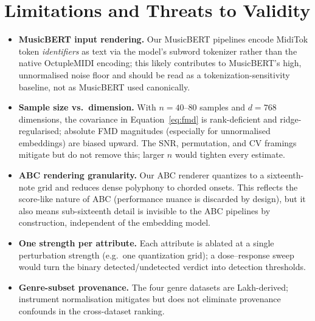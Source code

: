 \documentclass[11pt]{article}
\begin{document}
\section{Limitations and Threats to Validity}
\label{sec:limitations}
\begin{itemize}\itemsep2pt
\item \textbf{MusicBERT input rendering.} Our MusicBERT pipelines encode
MidiTok token \emph{identifiers} as text via the model's subword tokenizer
rather than the native OctupleMIDI encoding; this likely contributes to
MusicBERT's high, unnormalised noise floor and should be read as a
tokenization-sensitivity baseline, not as MusicBERT used canonically.
\item \textbf{Sample size vs.\ dimension.} With $n=40$--$80$ samples and
$d=768$ dimensions, the covariance in Equation~\eqref{eq:fmd} is
rank-deficient and ridge-regularised; absolute FMD magnitudes (especially
for unnormalised embeddings) are biased upward. The SNR, permutation, and CV
framings mitigate but do not remove this; larger $n$ would tighten every
estimate.
\item \textbf{ABC rendering granularity.} Our ABC renderer quantizes to a
sixteenth-note grid and reduces dense polyphony to chorded onsets. This
reflects the score-like nature of ABC (performance nuance is discarded by
design), but it also means sub-sixteenth detail is invisible to the ABC
pipelines by construction, independent of the embedding model.
\item \textbf{One strength per attribute.} Each attribute is ablated at a
single perturbation strength (e.g.\ one quantization grid); a
dose--response sweep would turn the binary detected/undetected verdict
into detection thresholds.
\item \textbf{Genre-subset provenance.} The four genre datasets are
Lakh-derived; instrument normalisation mitigates but does not eliminate
provenance confounds in the cross-dataset ranking.
\end{itemize}

\end{document}
